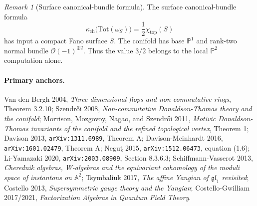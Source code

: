 \documentclass[11pt]{amsart}
\providecommand{\bP}{\mathbb{P}}
\providecommand{\cO}{\mathcal{O}}
\providecommand{\Tot}{\mathrm{Tot}}
\theoremstyle{plain}
\theoremstyle{definition}
\theoremstyle{remark}
\newtheorem{remark}[theorem]{Remark}
\begin{document}
\begin{remark}[Surface canonical-bundle formula]\label{rem:surface-canonical-bundle-formula}
The surface canonical-bundle formula
\[
  \kappa_{\mathrm{ch}}\bigl(\Tot(\omega_S)\bigr)
  =
  \frac{1}{2}\chi_{\mathrm{top}}(S)
\]
has input a compact Fano surface \(S\).  The conifold has base
\(\bP^1\) and rank-two normal bundle \(\cO(-1)^{\oplus 2}\).  Thus the
value \(3/2\) belongs to the local \(\bP^2\) computation alone.
\end{remark}

\paragraph{Primary anchors.}
Van den Bergh 2004, \emph{Three-dimensional flops and non-commutative
rings}, Theorem 3.2.10; Szendr\H{o}i 2008, \emph{Non-commutative
Donaldson-Thomas theory and the conifold}; Morrison, Mozgovoy, Nagao,
and Szendr\H{o}i 2011, \emph{Motivic Donaldson-Thomas invariants of the
conifold and the refined topological vertex}, Theorem 1; Davison
2013, \texttt{arXiv:1311.6989}, Theorem A; Davison-Meinhardt 2016,
\texttt{arXiv:1601.02479}, Theorem A; Negu\c{t} 2015,
\texttt{arXiv:1512.06473}, equation (1.6); Li-Yamazaki 2020,
\texttt{arXiv:2003.08909}, Section 8.3.6.3; Schiffmann-Vasserot 2013,
\emph{Cherednik algebras, W-algebras and the equivariant cohomology of
the moduli space of instantons on \(\mathbb{A}^2\)}; Tsymbaliuk 2017,
\emph{The affine Yangian of \(\mathfrak{gl}_1\) revisited}; Costello
2013, \emph{Supersymmetric gauge theory and the Yangian};
Costello-Gwilliam 2017/2021, \emph{Factorization Algebras in Quantum
Field Theory}.
\end{document}
